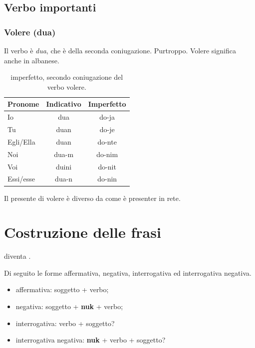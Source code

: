 \subsection{Verbo importanti}

\subsubsection{Volere (dua)}

Il verbo è \textit{dua}, che è della seconda coniugazione. Purtroppo.
Volere significa anche  in albanese.

\begin{table}[H]
    \centering
    \begin{tabular}{lcc}
        \toprule
        Pronome     &   Indicativo & Imperfetto \\
        \midrule
        Io          &   dua & do-ja \\
        Tu          &   duan & do-je \\
        Egli/Ella   &   duan & do-nte \\
        Noi         &   dua-m & do-nim \\
        Voi         &   duini & do-nit \\
        Essi/esse   &   dua-n & do-nin \\
        \bottomrule
    \end{tabular}
    \caption{imperfetto, secondo coniugazione del verbo volere.}
    \label{tbl:verb:secondaconiugazione:imperfetto}
\end{table}
Il presente di volere è diverso da come è presenter in rete\cite{angjelina}.

\section{Costruzione delle frasi}

 diventa .

Di seguito le forme affermativa, negativa, interrogativa ed interrogativa negativa.

\begin{itemize}
    \item affermativa: soggetto + verbo;
    \item negativa: soggetto + \textbf{nuk} + verbo;
    \item interrogativa: verbo + soggetto?
    \item interrogativa negativa: \textbf{nuk} + verbo + soggetto?
\end{itemize}

